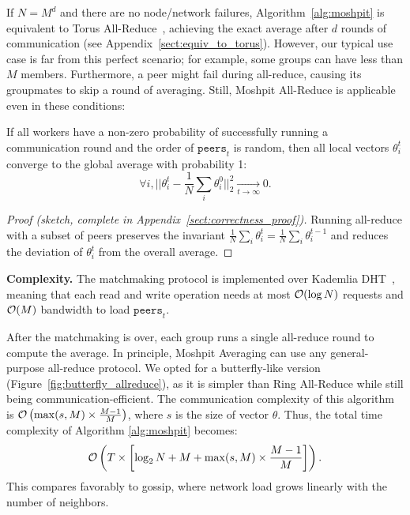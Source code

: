If $N {=} M^d$ and there are no node/network failures, Algorithm~\ref{alg:moshpit} is equivalent to Torus All-Reduce~\cite{torus_allreduce}, achieving the exact average after $d$ rounds of communication (see Appendix~\ref{sect:equiv_to_torus}).
However, our typical use case is far from this perfect scenario; for example, some groups can have less than $M$ members. Furthermore, a peer might fail during all-reduce, causing its groupmates to skip a round of averaging. 
Still, Moshpit All-Reduce is applicable even in these conditions:
\begin{theorem}[Correctness]\label{thm:quality_of_avg_deterministic_vectors_0}
If all workers have a non-zero probability of successfully running a communication round and the order of $\texttt{peers}_t$ is random, then all local vectors $\theta^t_i$ converge to the global average with probability 1:
\vspace{-4px}
\begin{equation}
    \forall i, \Big|\Big|\theta^t_i - \frac1N \sum_i \theta^0_i\Big|\Big|^2_2 \xrightarrow[t\to\infty]{} 0.
\end{equation}
\end{theorem}\vspace{-16pt}
\begin{proof}[Proof (sketch, complete in Appendix~\ref{sect:correctness_proof})]
Running all-reduce with a subset of peers preserves the invariant $\frac1N \sum_i \theta^t_i=\frac1N \sum_i \theta^{t-1}_i$ and reduces the deviation of $\theta^t_i$ from the overall average.
\end{proof}\vspace{-6pt}

\textbf{Complexity.} The matchmaking protocol is implemented over Kademlia DHT~\cite{kademlia}, meaning that each read and write operation needs at most ${\cal O}(\log N)$ requests and ${\cal O}(M)$ bandwidth to load $\texttt{peers}_t$.

After the matchmaking is over, each group runs a single all-reduce round to compute the average. In principle, Moshpit Averaging can use any general-purpose all-reduce protocol. We opted for a butterfly-like version (Figure~\ref{fig:butterfly_allreduce}), as it is simpler than Ring All-Reduce while still being communication-efficient. The communication complexity of this algorithm is ${\cal O}\left(\max(s, M) \times \frac{M - 1}{M}\right)$, where $s$ is the size of vector $\theta$. Thus, the total time complexity of Algorithm \ref{alg:moshpit} becomes:
\begin{equation}
    {\cal O}\left(T \times \left[\log_2{N} + M + \max(s, M) \times {\frac{M - 1}{M}}\right]\right).
\end{equation}
This compares favorably to gossip, where network load grows linearly with the number of neighbors.

